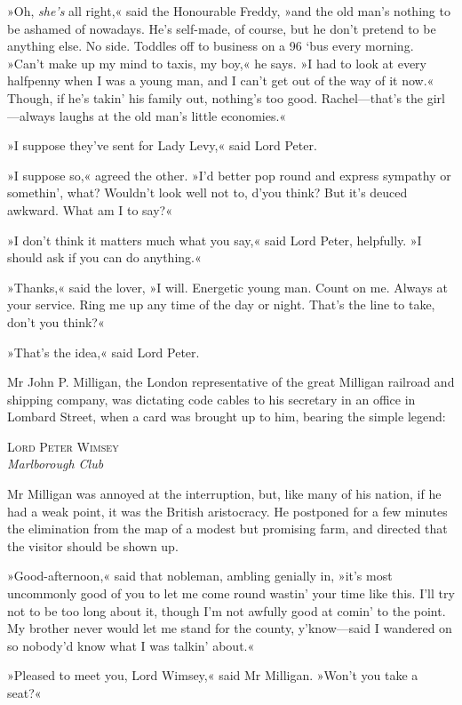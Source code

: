 »Oh, \textit{she's} all right,« said the Honourable Freddy, »and the old man's nothing to be ashamed of nowadays. He's self-made, of course, but he don't pretend to be anything else. No side. Toddles off to business on a 96 `bus every morning. »Can't make up my mind to taxis, my boy,« he says. »I had to look at every halfpenny when I was a young man, and I can't get out of the way of it now.« Though, if he's takin' his family out, nothing's too good. Rachel—that's the girl—always laughs at the old man's little economies.«

»I suppose they've sent for Lady Levy,« said Lord Peter.

»I suppose so,« agreed the other. »I'd better pop round and express sympathy or somethin', what? Wouldn't look well not to, d'you think? But it's deuced awkward. What am I to say?«

»I don't think it matters much what you say,« said Lord Peter, helpfully. »I should ask if you can do anything.«

»Thanks,« said the lover, »I will. Energetic young man. Count on me. Always at your service. Ring me up any time of the day or night. That's the line to take, don't you think?«

»That's the idea,« said Lord Peter.

Mr John P. Milligan, the London representative of the great Milligan railroad and shipping company, was dictating code cables to his secretary in an office in Lombard Street, when a card was brought up to him, bearing the simple legend:

\begin{center}
\textsc{Lord Peter Wimsey}\\
\textit{Marlborough Club}
\end{center}

Mr Milligan was annoyed at the interruption, but, like many of his nation, if he had a weak point, it was the British aristocracy. He postponed for a few minutes the elimination from the map of a modest but promising farm, and directed that the visitor should be shown up.

»Good-afternoon,« said that nobleman, ambling genially in, »it's most uncommonly good of you to let me come round wastin' your time like this. I'll try not to be too long about it, though I'm not awfully good at comin' to the point. My brother never would let me stand for the county, y'know—said I wandered on so nobody'd know what I was talkin' about.«

»Pleased to meet you, Lord Wimsey,« said Mr Milligan. »Won't you take a seat?«

